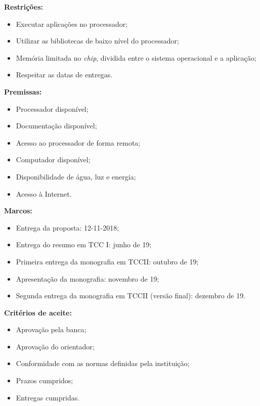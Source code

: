 \documentclass[
	12pt,				%
	openright,			%
	twoside,			%
	a4paper,			%
	english,			%
	brazil,				%
	]{abntex2}
\begin{document}
    \begin{flushleft}
    \textbf{Restrições:}
    \begin{itemize}
        \item Executar aplicações no processador;
        \item Utilizar as bibliotecas de baixo nível do processador;
        \item Memória limitada no \textit{chip}, dividida entre o sistema operacional e a aplicação;
        \item Respeitar as datas de entregas.
    \end{itemize}
    
    \textbf{Premissas:}
    \begin{itemize}
        \item Processador disponível;
        \item Documentação disponível;
        \item Acesso ao processador de forma remota; 
        \item Computador disponível; 
        \item Disponibilidade de água, luz e energia;
        \item Acesso à Internet.
    \end{itemize}
    
    \textbf{Marcos:}
    \begin{itemize}
        \item Entrega da proposta: 12-11-2018;
        \item Entrega do resumo em TCC I: junho de 19; 
        \item Primeira entrega da monografia em TCCII: outubro de 19; 
        \item Apresentação da monografia: novembro de 19;
        \item Segunda entrega da monografia em TCCII (versão final): dezembro de 19.
    \end{itemize}
    
    \textbf{Critérios de aceite:}
    \begin{itemize}
        \item Aprovação pela banca;
        \item Aprovação do orientador;
        \item Conformidade com as normas definidas pela instituição;
        \item Prazos cumpridos;
        \item Entregas cumpridas.
    \end{itemize}
    \end{flushleft}
\end{document}
